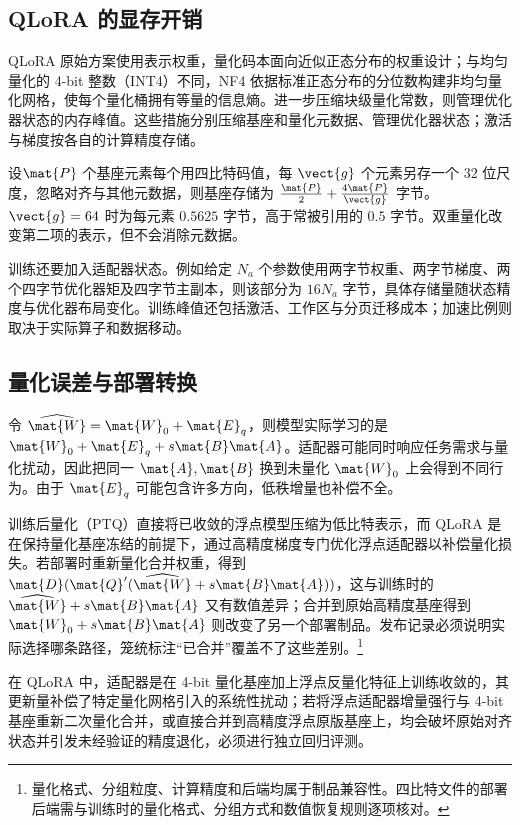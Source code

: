 \documentclass[../textbook.tex]{subfiles}
\begin{document}
\subsection{QLoRA 的显存开销}
QLoRA 原始方案使用表示权重，量化码本面向近似正态分布的权重设计；与均匀量化的 4-bit 整数（INT4）不同，NF4 依据标准正态分布的分位数构建非均匀量化网格，使每个量化桶拥有等量的信息熵。进一步压缩块级量化常数，则管理优化器状态的内存峰值\cite{dettmers2023qlora}。这些措施分别压缩基座和量化元数据、管理优化器状态；激活与梯度按各自的计算精度存储。

设$\mat{P}$ 个基座元素每个用四比特码值，每 $\vect{g}$ 个元素另存一个 $32$ 位尺度，忽略对齐与其他元数据，则基座存储为 $\frac{\mat{P}}{2}+\frac{4\mat{P}}{\vect{g}}$ 字节。$\vect{g}=64$ 时为每元素 $0.5625$ 字节，高于常被引用的 $0.5$ 字节。双重量化改变第二项的表示，但不会消除元数据。

训练还要加入适配器状态。例如给定 $N_a$ 个参数使用两字节权重、两字节梯度、两个四字节优化器矩及四字节主副本，则该部分为 $16N_a$ 字节，具体存储量随状态精度与优化器布局变化。训练峰值还包括激活、工作区与分页迁移成本；加速比例则取决于实际算子和数据移动。

\subsection{量化误差与部署转换}
令 $\widehat{\mat{W}}=\mat{W}_0+\mat{E}_q$，则模型实际学习的是 $\mat{W}_0+\mat{E}_q+s\mat{B}\mat{A}$。适配器可能同时响应任务需求与量化扰动，因此把同一 $\mat{A},\mat{B}$ 换到未量化 $\mat{W}_0$ 上会得到不同行为。由于 $\mat{E}_q$ 可能包含许多方向，低秩增量也补偿不全。

训练后量化（PTQ）直接将已收敛的浮点模型压缩为低比特表示，而 QLoRA 是在保持量化基座冻结的前提下，通过高精度梯度专门优化浮点适配器以补偿量化损失。若部署时重新量化合并权重，得到 $\mat{D}(\mat{Q}'(\widehat{\mat{W}}+s\mat{B}\mat{A}))$，这与训练时的 $\widehat{\mat{W}}+s\mat{B}\mat{A}$ 又有数值差异；合并到原始高精度基座得到 $\mat{W}_0+s\mat{B}\mat{A}$ 则改变了另一个部署制品。发布记录必须说明实际选择哪条路径，笼统标注“已合并”覆盖不了这些差别。\footnote{量化格式、分组粒度、计算精度和后端均属于制品兼容性。四比特文件的部署后端需与训练时的量化格式、分组方式和数值恢复规则逐项核对。}

\begin{warning}
在 QLoRA 中，适配器是在 4-bit 量化基座加上浮点反量化特征上训练收敛的，其更新量补偿了特定量化网格引入的系统性扰动；若将浮点适配器增量强行与 4-bit 基座重新二次量化合并，或直接合并到高精度浮点原版基座上，均会破坏原始对齐状态并引发未经验证的精度退化，必须进行独立回归评测。
\end{warning}
\end{document}
